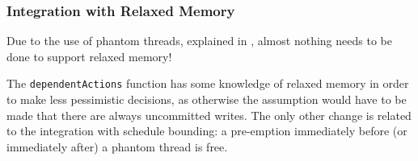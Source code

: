 \subsubsection{Integration with Relaxed Memory}
\label{sec:sct-por-relaxed}

Due to the use of phantom threads, explained in
, almost nothing needs to be done to
support relaxed memory!

The \verb|dependentActions| function has some knowledge of relaxed
memory in order to make less pessimistic decisions, as otherwise the
assumption would have to be made that there are always uncommitted
writes. The only other change is related to the integration with
schedule bounding: a pre-emption immediately before (or immediately
after) a phantom thread is free.
